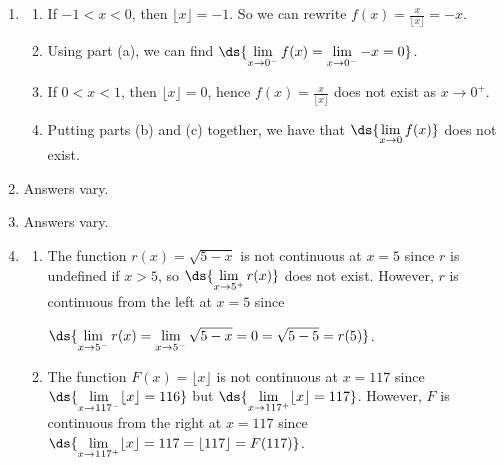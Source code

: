 \documentclass{ximera}
\begin{document}
\begin{enumerate}
\setcounter{enumi}{\value{HW}}

\item   \begin{enumerate}

\item  If $-1 < x < 0$, then $\lfloor x \rfloor = -1$. So we can rewrite $f(x) = \frac{x}{\lfloor x \rfloor} = -x$.

\smallskip

\item  Using part (a), we can find  $\ds{ \lim_{x \rightarrow 0^{-}} f(x) =  \lim_{x \rightarrow 0^{-}} -x = 0}$.

\smallskip

\item  If $0 < x < 1$, then $\lfloor x \rfloor =0$, hence $f(x) = \frac{x}{\lfloor x \rfloor}$ does not exist as $x \rightarrow 0^{+}$.

\smallskip

\item  Putting parts (b) and (c) together, we have that   $\ds{ \lim_{x \rightarrow 0} f(x)}$   does not exist.

\smallskip

\end{enumerate}

\item Answers vary.

\item  Answers vary.

\item \begin{enumerate} \item    The function $r(x) = \sqrt{5-x}$ is not continuous at $x = 5$ since $r$ is undefined if $x>5$, so $\ds{\lim_{x \rightarrow 5^{+}} r(x)}$ does not exist. However, $r$ is continuous from the left at $x = 5$ since 

$\ds{\lim_{x \rightarrow 5^{-}} r(x) =  \lim_{x \rightarrow 5^{-}} \sqrt{5-x} = 0 = \sqrt{5-5} = r(5)}$.

\smallskip

\item  The function  $F(x) = \lfloor x \rfloor$ is not continuous at $x = 117$ since $\ds{\lim_{x \rightarrow 117^{-}} \lfloor x \rfloor = 116}$ but $\ds{\lim_{x \rightarrow 117^{+}} \lfloor x \rfloor = 117}$.  However, $F$ is continuous from the right at $x = 117$ since $\ds{\lim_{x \rightarrow 117^{+}} \lfloor x \rfloor = 117 = \lfloor 117 \rfloor = F(117)}$. 


\end{enumerate}
\end{enumerate}
\end{document}
